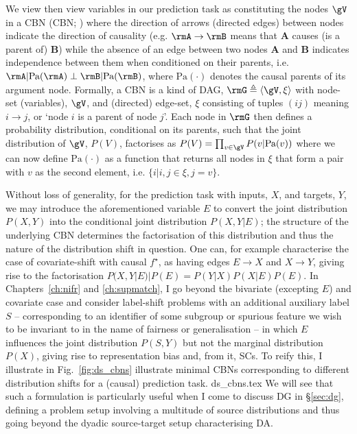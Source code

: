 We view then view variables in our prediction task as constituting the nodes \( \gV \) in a
\acl{CBN} (\acs{CBN}; \citealp{pearl1995bayesian}) where the direction of arrows (directed edges)
between nodes indicate the direction of causality (e.g. \(\rmA \to \rmB \) means that \textbf{A}
causes (is a parent of) \textbf{B}) while the absence of an edge between two nodes \textbf{A} and
\textbf{B} indicates independence between them when conditioned on their parents, i.e. \( \rmA |
\text{Pa}(\rmA) \perp \rmB | \text{Pa}(\rmB) \), where \( \text{Pa}(\cdot) \) denotes the causal
parents of its argument node.
%
Formally, a \ac{CBN} is a kind of \ac{DAG}, \(\rmG \triangleq \langle \gV, \xi
\rangle \) with node-set (variables), \(\gV\), and (directed) edge-set, \(\xi\) consisting of
tuples \((ij)\) meaning \(i \to j \), or `node \(i\) is a parent of node \(j\)'.
%
Each node in \( \rmG \) then defines a probability distribution, conditional on its parents, such
that the joint distribution of \(\gV\), \( P(V) \), factorises as \( P(V) = \prod_{v \in \gV} P(v |
\text{Pa}(v)) \) where we can now define \(\text{Pa}(\cdot)\) as a function that returns all nodes
in \(\xi\) that form a pair with \(v\) as the second element, i.e. \( \{ i | i,j \in \xi, j = v \}
\).
%

Without loss of generality, for the prediction task with inputs, \(X\), and targets, \(Y\), we may
introduce the aforementioned variable \(E\) to convert the joint distribution \(P(X, Y)\) into the
conditional joint distribution \( P(X, Y | E ) \); the structure of the underlying \ac{CBN} determines
the factorisation of this distribution and thus the nature of the distribution shift in question.
%
One can, for example characterise the case of covariate-shift with causal \(f^\star\), as having
edges  \(E \to X\) and \( X \to Y \), giving rise to the factorisation \( P(X, Y | E) | P(E) =
P(Y|X)P(X|E)P(E) \). 
%
In Chapters~\ref{ch:nifr} and \ref{ch:supmatch}, I go beyond the bivariate (excepting \( E \)) and
covariate case and consider label-shift problems with an additional auxiliary label \(S\) --
corresponding to an identifier of some subgroup or spurious feature we wish to be invariant to in
the name of fairness or generalisation --  in which \(E\) influences the joint distribution \( P(S,
Y) \) but not the marginal distribution \(P(X)\), giving rise to representation bias and, from it,
\acp{SC}.
%
To reify this, I illustrate in Fig.~\ref{fig:ds_cbns} illustrate minimal \acp{CBN} corresponding to
different distribution shifts for a (causal) prediction task.
%
{ds_cbns.tex}
%
We will see that such a formulation is particularly useful when I come to discuss \acl{DG} in
\S\ref{sec:dg}, defining a problem setup involving a multitude of source distributions and thus
going beyond the dyadic source-target setup characterising \ac{DA}.
%

